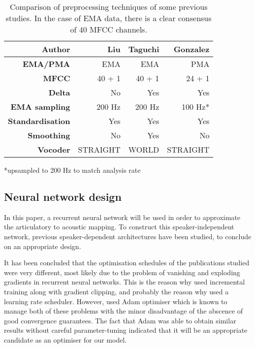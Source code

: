 \documentclass[a4paper]{article}
\begin{document}
\begin{table}[th]
  \caption{Comparison of preprocessing techniques of some previous studies.
  In the case of EMA data, there is a clear consensus of 40 MFCC channels.}
  \vspace{0.5em}
  \label{tab:example}
  \centering
  \footnotesize
  \begin{tabular}{ r r r r }
    \toprule
    \textbf{Author} & \textbf{Liu} & \textbf{Taguchi} & \textbf{Gonzalez} \\
    \midrule
    \textbf{EMA/PMA} & EMA & EMA & PMA \\
    \textbf{MFCC} & 40 + 1 & 40 + 1 & 24 + 1 \\
    \textbf{Delta} & No & Yes & Yes \\
    \textbf{EMA sampling} & 200 Hz & 200 Hz & 100 Hz* \\
    \textbf{Standardisation} & Yes & Yes & Yes \\
    \textbf{Smoothing} & No & Yes  & No \\
    \textbf{Vocoder} & STRAIGHT \cite{Kawahara2006} & WORLD  & STRAIGHT \\
    \bottomrule
  \end{tabular}
  *upsampled to 200 Hz to match analysis rate
  \vspace{-2em}
\end{table}

\subsection{Neural network design} \label{section:nnexperiment}

In this paper, a recurrent neural network will be used in order to
approximate the articulatory to acoustic mapping. To construct
this speaker-independent network, previous speaker-dependent architectures
have been studied, to conclude on an appropriate design.

It has been concluded that the optimisation schedules of the publications
studied were very different, most likely due to the problem of vanishing and
exploding gradients in recurrent neural networks.
This is the reason why \cite{Taguchi} used incremental
training along with gradient clipping, and probably the reason why \cite{Liu2018} used a learning rate
scheduler. However, \cite{Gonzalez2017} used Adam optimiser \cite{Kingma2015}
which is known to manage both of these problems with the minor disadvantage of
the abscence of good convergence guarantees. The fact that Adam was able
to obtain similar results without careful parameter-tuning indicated that
it will be an appropriate candidate as an optimiser for our model. 
\end{document}
